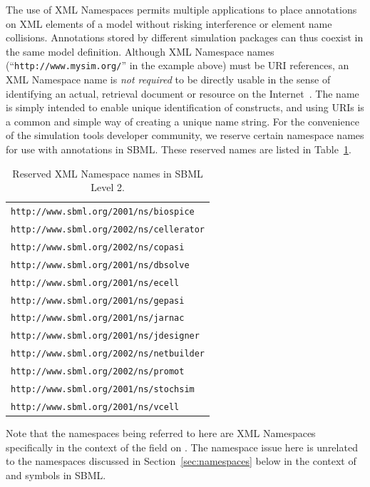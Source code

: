 \documentclass[10pt,twocolumntoc]{cekarticle}
\newcommand{\vref}[1]{\ref{#1}}
\begin{document}
The use of XML Namespaces permits multiple applications to place
annotations on XML elements of a model without risking interference or
element name collisions.  Annotations stored by different simulation
packages can thus coexist in the same model definition.  Although XML
Namespace names (``\texttt{http://www.mysim.org/}'' in the example above)
must be URI references, an XML Namespace name is \emph{not required} to be
directly usable in the sense of identifying an actual, retrieval document
or resource on the Internet~\citep{bray:1999}.  The name is simply intended
to enable unique identification of constructs, and using URIs is a common
and simple way of creating a unique name string.  For the convenience of
the simulation tools developer community, we reserve certain namespace
names for use with annotations in SBML.  These reserved names are listed in
Table~\vref{tab:reserved-urls}.

\begin{table}[t]
  \vspace*{5pt}
  \centering
  \begin{tabular}{l}
    \toprule
    \texttt{http://www.sbml.org/2001/ns/biospice}\\
    \texttt{http://www.sbml.org/2002/ns/cellerator}\\
    \texttt{http://www.sbml.org/2002/ns/copasi}\\
    \texttt{http://www.sbml.org/2001/ns/dbsolve}\\
    \texttt{http://www.sbml.org/2001/ns/ecell}\\
    \texttt{http://www.sbml.org/2001/ns/gepasi}\\
    \texttt{http://www.sbml.org/2001/ns/jarnac}\\
    \texttt{http://www.sbml.org/2001/ns/jdesigner}\\
    \texttt{http://www.sbml.org/2002/ns/netbuilder}\\
    \texttt{http://www.sbml.org/2002/ns/promot}\\
    \texttt{http://www.sbml.org/2001/ns/stochsim}\\
    \texttt{http://www.sbml.org/2001/ns/vcell}\\
    \bottomrule
  \end{tabular}
  \caption{Reserved XML Namespace names in SBML Level 2.}
  \label{tab:reserved-urls}
\end{table}

Note that the namespaces being referred to here are XML Namespaces
specifically in the context of the  field on
.  The namespace issue here is unrelated to the namespaces
discussed in Section~\ref{sec:namespaces} below in the context of
 and symbols in SBML.
\end{document}
